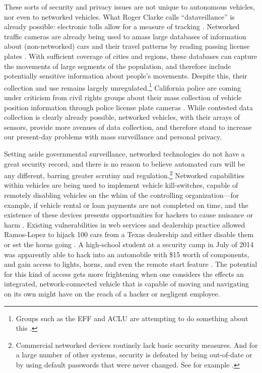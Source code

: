 
These sorts of security and privacy issues are not unique to
autonomous vehicles, nor even to networked vehicles. What Roger Clarke
calls ``dataveillance'' is already possible: electronic tolls
allow for a measure of tracking \cite[p. 25]{nissenbaum}. Networked
traffic cameras are 
already being used to amass large databases of information about
(non-networked) cars and their travel patterns by reading passing
license plates \cite[p. 26]{nissenbaum}. With sufficient coverage of
cities and regions, 
these databases can capture the movements of large segments of the
population, and therefore include potentially sensitive information
about people's movements. Despite this, their collection and use
remains largely unregulated.\footnote{Groups such as the EFF and ACLU
  are attempting to do something about this \cite{kayyaliEFF}.}
California police are coming under 
criticism from civil rights groups about their mass collection of
vehicle position information through police license plate cameras \cite{maassCivil}.
While contested data collection is clearly already
possible, networked vehicles, with their arrays of sensors,
provide more avenues of data collection, and therefore stand to
increase our present-day problems with mass surveillance and personal
privacy.

Setting aside governmental surveillance, networked technologies do not
have a great security record, 
and there is no reason to believe automated cars will be any
different, barring greater scrutiny and
regulation.\footnote{Commercial networked devices routinely lack basic
security measures. And for a large number of other systems, security
is defeated by being out-of-date or by using default passwords that
were never changed. See for example \cite{zetter}.}
Networked capabilities within vehicles are being used to
implement vehicle kill-switches, capable of remotely disabling
vehicles on the whim of the controlling organization---for example, if
vehicle rental or loan payments are not completed on time, and the existence of these devices
presents opportunities for hackers to cause nuisance or
harm \cite{goodman}.
Existing vulnerabilities in web services and dealership practice
allowed Ramos-Lopez to hijack 100 cars from a Texas dealership and
either disable them or set
the horns
going \cite{poulsenHacker}. A
high-school student at a security camp in July of 2014 was apparently
able to hack into an automobile with \$15 worth of components, and
gain access to lights, horns, and even the remote start
feature \cite{bigelow14}.
The
potential for this kind of access gets more frightening when one
considers the effects an integrated, network-connected vehicle that is capable of
moving and navigating on its own might have on the reach of a hacker or negligent employee.

